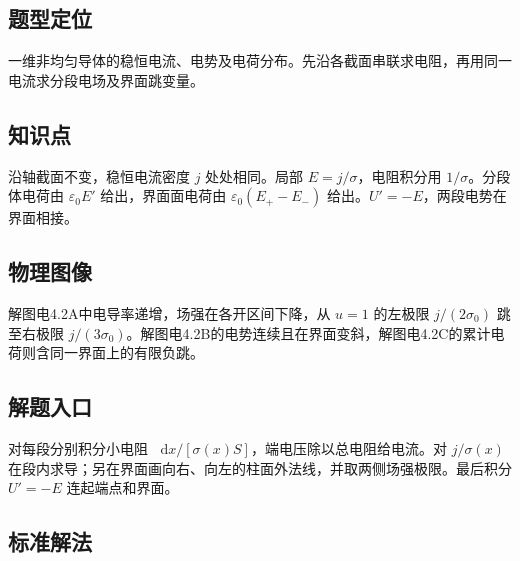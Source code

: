 \documentclass[UTF8,fontset=fandol,a4paper,11pt]{ctexart}
\newcommand{\dd}{\mathop{}\!\mathrm{d}}
\begin{document}


\subsection*{题型定位}

一维非均匀导体的稳恒电流、电势及电荷分布。先沿各截面串联求电阻，再用同一电流求分段电场及界面跳变量。



\subsection*{知识点}

沿轴截面不变，稳恒电流密度 $j$ 处处相同。局部 $E=j/\sigma$，电阻积分用 $1/\sigma$。分段体电荷由 $\varepsilon_0 E'$ 给出，界面面电荷由 $\varepsilon_0(E_+-E_-)$ 给出。$U'=-E$，两段电势在界面相接。



\subsection*{物理图像}

解图电4.2A中电导率递增，场强在各开区间下降，从 $u=1$ 的左极限 $j/(2\sigma_0)$ 跳至右极限 $j/(3\sigma_0)$。解图电4.2B的电势连续且在界面变斜，解图电4.2C的累计电荷则含同一界面上的有限负跳。



\subsection*{解题入口}

对每段分别积分小电阻 $\dd x/[\sigma(x)S]$，端电压除以总电阻给电流。对 $j/\sigma(x)$ 在段内求导；另在界面画向右、向左的柱面外法线，并取两侧场强极限。最后积分 $U'=-E$ 连起端点和界面。


\subsection*{标准解法}
\end{document}
